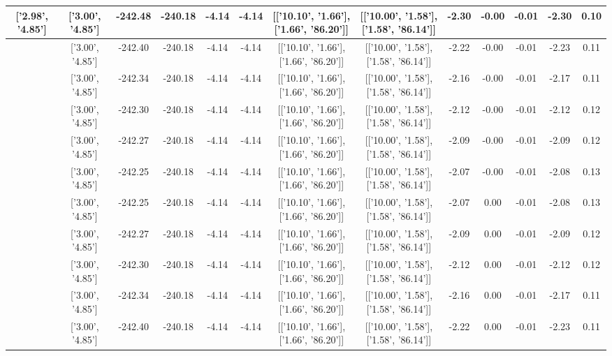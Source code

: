 \begin{table}[htbp]
\begin{adjustbox}{angle=90}
\begin{tabular}{|c|c|c|c|c|c|c|c|c|c|c|c|c|}
 ['2.98', '4.85'] & ['3.00', '4.85'] & -242.48 & -240.18 & -4.14 & -4.14 & [['10.10', '1.66'], ['1.66', '86.20']] & [['10.00', '1.58'], ['1.58', '86.14']] & -2.30 & -0.00 & -0.01 & -2.30 & 0.10\\ \hline
 ['2.98', '4.85'] & ['3.00', '4.85'] & -242.40 & -240.18 & -4.14 & -4.14 & [['10.10', '1.66'], ['1.66', '86.20']] & [['10.00', '1.58'], ['1.58', '86.14']] & -2.22 & -0.00 & -0.01 & -2.23 & 0.11\\ \hline
 ['2.99', '4.85'] & ['3.00', '4.85'] & -242.34 & -240.18 & -4.14 & -4.14 & [['10.10', '1.66'], ['1.66', '86.20']] & [['10.00', '1.58'], ['1.58', '86.14']] & -2.16 & -0.00 & -0.01 & -2.17 & 0.11\\ \hline
 ['2.99', '4.85'] & ['3.00', '4.85'] & -242.30 & -240.18 & -4.14 & -4.14 & [['10.10', '1.66'], ['1.66', '86.20']] & [['10.00', '1.58'], ['1.58', '86.14']] & -2.12 & -0.00 & -0.01 & -2.12 & 0.12\\ \hline
 ['2.99', '4.85'] & ['3.00', '4.85'] & -242.27 & -240.18 & -4.14 & -4.14 & [['10.10', '1.66'], ['1.66', '86.20']] & [['10.00', '1.58'], ['1.58', '86.14']] & -2.09 & -0.00 & -0.01 & -2.09 & 0.12\\ \hline
 ['3.00', '4.85'] & ['3.00', '4.85'] & -242.25 & -240.18 & -4.14 & -4.14 & [['10.10', '1.66'], ['1.66', '86.20']] & [['10.00', '1.58'], ['1.58', '86.14']] & -2.07 & -0.00 & -0.01 & -2.08 & 0.13\\ \hline
 ['3.00', '4.85'] & ['3.00', '4.85'] & -242.25 & -240.18 & -4.14 & -4.14 & [['10.10', '1.66'], ['1.66', '86.20']] & [['10.00', '1.58'], ['1.58', '86.14']] & -2.07 & 0.00 & -0.01 & -2.08 & 0.13\\ \hline
 ['3.01', '4.85'] & ['3.00', '4.85'] & -242.27 & -240.18 & -4.14 & -4.14 & [['10.10', '1.66'], ['1.66', '86.20']] & [['10.00', '1.58'], ['1.58', '86.14']] & -2.09 & 0.00 & -0.01 & -2.09 & 0.12\\ \hline
 ['3.01', '4.85'] & ['3.00', '4.85'] & -242.30 & -240.18 & -4.14 & -4.14 & [['10.10', '1.66'], ['1.66', '86.20']] & [['10.00', '1.58'], ['1.58', '86.14']] & -2.12 & 0.00 & -0.01 & -2.12 & 0.12\\ \hline
 ['3.01', '4.85'] & ['3.00', '4.85'] & -242.34 & -240.18 & -4.14 & -4.14 & [['10.10', '1.66'], ['1.66', '86.20']] & [['10.00', '1.58'], ['1.58', '86.14']] & -2.16 & 0.00 & -0.01 & -2.17 & 0.11\\ \hline
 ['3.02', '4.86'] & ['3.00', '4.85'] & -242.40 & -240.18 & -4.14 & -4.14 & [['10.10', '1.66'], ['1.66', '86.20']] & [['10.00', '1.58'], ['1.58', '86.14']] & -2.22 & 0.00 & -0.01 & -2.23 & 0.11\\ \hline

\end{tabular}
\end{adjustbox}
\end{table}
